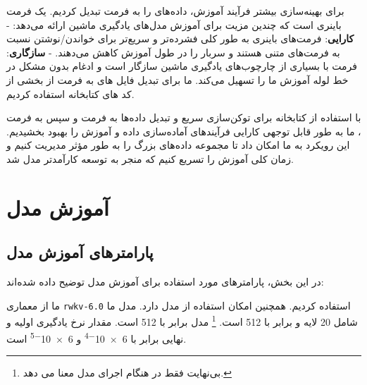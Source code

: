 برای بهینه‌سازی بیشتر فرآیند آموزش، داده‌های  را به فرمت  تبدیل
کردیم.  یک فرمت باینری است که چندین مزیت برای آموزش مدل‌های یادگیری
ماشین ارائه می‌دهد: - \textbf{کارایی}: فرمت‌های باینری به طور کلی فشرده‌تر
و سریع‌تر برای خواندن/نوشتن نسبت به فرمت‌های متنی هستند و سربار  را در
طول آموزش کاهش می‌دهند. - \textbf{سازگاری}: فرمت  با بسیاری از
چارچوب‌های یادگیری ماشین سازگار است و ادغام بدون مشکل در خط لوله آموزش ما
را تسهیل می‌کند. ما برای تبدیل فایل های  به فرمت  از بخشی از کد های کتابخانه  \cite{gpt-neox-library} استفاده کردیم.

با استفاده از کتابخانه  برای توکن‌سازی سریع و تبدیل داده‌ها به
فرمت  و سپس به فرمت ، ما به طور قابل توجهی کارایی فرآیندهای
آماده‌سازی داده و آموزش را بهبود بخشیدیم. این رویکرد به ما امکان داد تا
مجموعه داده‌های بزرگ را به طور مؤثر مدیریت کنیم و زمان کلی آموزش را تسریع
کنیم که منجر به توسعه کارآمدتر مدل شد.

\section{آموزش مدل}
\subsection{پارامترهای آموزش مدل}
در این بخش، پارامترهای مورد استفاده برای آموزش مدل توضیح داده شده‌اند:

ما از معماری \texttt{rwkv-6.0} \cite{peng2024eagle} استفاده کردیم. همچنین
امکان استفاده از مدل دارد. مدل ما شامل 20 لایه و
 برابر با 512 است.  \footnote{ بی‌نهایت فقط در هنگام اجرای مدل معنا می  دهد.} مدل برابر با
512 است.
مقدار نرخ یادگیری اولیه و نهایی برابر با \num{6e-4}   و \num{6e-5} است.

